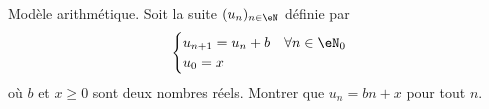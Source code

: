 


\begin{exercice}\label{exoTD3-0004}

	Modèle arithmétique. Soit la suite $(u_n)_{n\in\eN}$ définie par
	\begin{equation}
		\begin{cases}
			u_{n+1}=u_n+b	&	\text{$\forall n\in\eN_0$}\\
			u_0=x
		\end{cases}
	\end{equation}
	où $b$ et $x\geq 0$ sont deux nombres réels. Montrer que $u_n=bn+x$ pour tout $n$.

\end{exercice}
